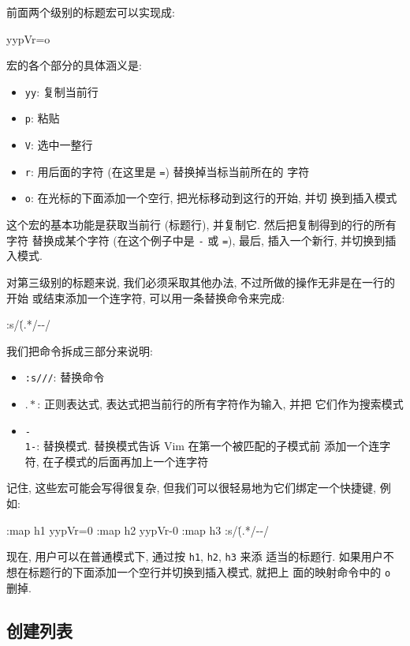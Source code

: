 前面两个级别的标题宏可以实现成:
\begin{vimcode}
yypVr=o
\end{vimcode}
宏的各个部分的具体涵义是:
\begin{itemize}
    \item \texttt{yy}: 复制当前行
    \item \texttt{p}: 粘贴
    \item \texttt{V}: 选中一整行
    \item \texttt{r}: 用后面的字符 (在这里是 \texttt{=}) 替换掉当标当前所在的
        字符
    \item \texttt{o}: 在光标的下面添加一个空行, 把光标移动到这行的开始, 并切
        换到插入模式
\end{itemize}

这个宏的基本功能是获取当前行 (标题行), 并复制它. 然后把复制得到的行的所有字符
替换成某个字符 (在这个例子中是 \texttt{-} 或 \texttt{=}), 最后, 插入一个新行,
并切换到插入模式.

对第三级别的标题来说, 我们必须采取其他办法, 不过所做的操作无非是在一行的开始
或结束添加一个连字符, 可以用一条替换命令来完成:
\begin{vimcode}
:s/\.(.*\)/-\1-/
\end{vimcode}
我们把命令拆成三部分来说明:
\begin{itemize}
    \item \texttt{:s///}: 替换命令
    \item \texttt{\(.*\)}: 正则表达式, 表达式把当前行的所有字符作为输入, 并把
        它们作为搜索模式
    \item \texttt{-\\1-}: 替换模式. 替换模式告诉 Vim 在第一个被匹配的子模式前
        添加一个连字符, 在子模式的后面再加上一个连字符
\end{itemize}

记住, 这些宏可能会写得很复杂, 但我们可以很轻易地为它们绑定一个快捷键, 例如:
\begin{vimcode}
:map h1 yypVr=0
:map h2 yypVr-0
:map h3 :s/\.(.*\)/-\1-/
\end{vimcode}
现在, 用户可以在普通模式下, 通过按 \texttt{h1}, \texttt{h2}, \texttt{h3} 来添
适当的标题行. 如果用户不想在标题行的下面添加一个空行并切换到插入模式, 就把上
面的映射命令中的 \texttt{o} 删掉.

\subsection{创建列表}
\label{subsec:creating_lists}

